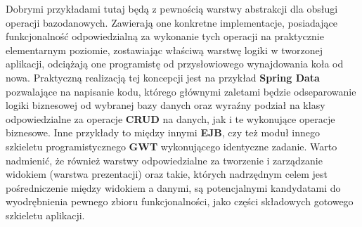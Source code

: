 	Dobrymi przykładami tutaj będą z pewnością warstwy abstrakcji dla obsługi operacji bazodanowych. Zawierają one konkretne implementacje, posiadające funkcjonalność odpowiedzialną za wykonanie tych operacji na praktycznie elementarnym poziomie, zostawiając właściwą warstwę logiki w tworzonej aplikacji, odciążają one programistę od przysłowiowego wynajdowania koła od nowa. Praktyczną realizacją tej koncepcji jest na przykład \textbf{Spring Data} pozwalające na napisanie kodu, którego głównymi zaletami będzie odseparowanie logiki biznesowej od wybranej bazy danych oraz wyraźny podział na klasy odpowiedzialne za operacje \textbf{CRUD} na danych, jak i te wykonujące operacje biznesowe. Inne przykłady to między innymi \textbf{EJB}, czy też moduł innego szkieletu programistycznego \textbf{GWT} wykonującego identyczne zadanie. Warto nadmienić, że również warstwy odpowiedzialne za tworzenie i zarządzanie widokiem (warstwa prezentacji) oraz takie, których nadrzędnym celem jest pośredniczenie między widokiem a danymi, są potencjalnymi kandydatami do wyodrębnienia pewnego zbioru funkcjonalności, jako części składowych gotowego szkieletu aplikacji. 
	
